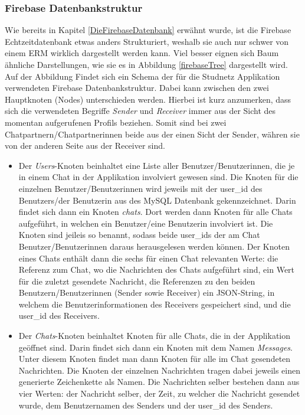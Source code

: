 \documentclass[../main.tex]{subfiles}
\begin{document}
	\subsubsection{Firebase Datenbankstruktur}
	Wie bereits in Kapitel \ref{DieFirebaseDatenbank} erwähnt wurde, ist die Firebase Echtzeitdatenbank etwas anders Strukturiert, weshalb sie auch nur schwer von einem ERM wirklich dargestellt werden kann. Viel besser eignen sich Baum ähnliche Darstellungen, wie sie es in Abbildung \ref{firebaseTree} dargestellt wird. Auf der Abbildung Findet sich ein Schema der für die Studnetz Applikation verwendeten Firebase Datenbankstruktur. Dabei kann zwischen den zwei Hauptknoten (Nodes) unterschieden werden. Hierbei ist kurz anzumerken, dass sich die verwendeten Begriffe \emph{Sender} und \emph{Receiver} immer aus der Sicht des momentan aufgerufenen Profils beziehen. Somit sind bei zwei Chatpartnern/Chatpartnerinnen beide aus der einen Sicht der Sender, währen sie von der anderen Seite aus der Receiver sind.
	
	\begin{itemize}
		\item Der \emph{Users}-Knoten beinhaltet eine Liste aller Benutzer/Benutzerinnen, die je in einem Chat in der Applikation involviert gewesen sind. Die Knoten für die einzelnen Benutzer/Benutzerinnen wird jeweils mit der user\_id des Benutzers/der Benutzerin aus des MySQL Datenbank gekennzeichnet. Darin findet sich dann ein Knoten \emph{chats}. Dort werden dann Knoten für alle Chats aufgeführt, in welchen ein Benutzer/eine Benutzerin involviert ist. Die Knoten sind jeileis so benannt, sodass beide user\_ids der am Chat Benutzer/Benutzerinnen daraus herausgelesen werden können. Der Knoten eines Chats enthält dann die sechs für einen Chat relevanten Werte: die Referenz zum Chat, wo die Nachrichten des Chats aufgeführt sind, ein Wert für die zuletzt gesendete Nachricht, die Referenzen zu den beiden Benutzern/Benutzerinnen (Sender sowie Receiver) ein JSON-String, in welchem die Benutzerinformationen des Receivers gespeichert sind, und die user\_id des Receivers.
		\item  Der \emph{Chats}-Knoten beinhaltet Knoten für alle Chats, die in der Applikation geöffnet sind. Darin findet sich dann ein Knoten mit dem Namen \emph{Messages}. Unter diesem Knoten findet man dann Knoten für alle im Chat gesendeten Nachrichten. Die Knoten der einzelnen Nachrichten tragen dabei jeweils einen generierte Zeichenkette als Namen. Die Nachrichten selber bestehen dann aus vier Werten: der Nachricht selber, der Zeit, zu welcher die Nachricht gesendet wurde, dem Benutzernamen des Senders und der user\_id des Senders.
	\end{itemize}
\end{document}
